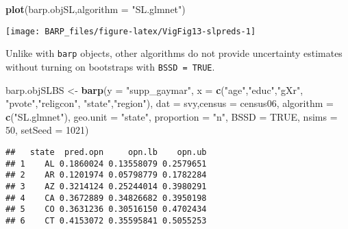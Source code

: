 \documentclass[]{article}
\newenvironment{Shaded}{\begin{snugshade}}{\end{snugshade}}
\newcommand{\KeywordTok}[1]{\textcolor[rgb]{0.13,0.29,0.53}{\textbf{#1}}}
\newcommand{\DataTypeTok}[1]{\textcolor[rgb]{0.13,0.29,0.53}{#1}}
\newcommand{\DecValTok}[1]{\textcolor[rgb]{0.00,0.00,0.81}{#1}}
\newcommand{\StringTok}[1]{\textcolor[rgb]{0.31,0.60,0.02}{#1}}
\newcommand{\OtherTok}[1]{\textcolor[rgb]{0.56,0.35,0.01}{#1}}
\newcommand{\OperatorTok}[1]{\textcolor[rgb]{0.81,0.36,0.00}{\textbf{#1}}}
\newcommand{\NormalTok}[1]{#1}
\begin{document}
\begin{Shaded}
\begin{Highlighting}[]
\KeywordTok{plot}\NormalTok{(barp.objSL,}\DataTypeTok{algorithm =} \StringTok{"SL.glmnet"}\NormalTok{)}
\end{Highlighting}
\end{Shaded}

\begin{center}\texttt{[image: BARP\_files/figure-latex/VigFig13-slpreds-1]} \end{center}

Unlike with \texttt{barp} objects, other algorithms do not provide
uncertainty estimates without turning on bootstraps with
\texttt{BSSD\ =\ TRUE}.

\begin{Shaded}
\begin{Highlighting}[]
\NormalTok{barp.objSLBS <-}\StringTok{ }\KeywordTok{barp}\NormalTok{(}\DataTypeTok{y =} \StringTok{"supp_gaymar"}\NormalTok{,}
                 \DataTypeTok{x =} \KeywordTok{c}\NormalTok{(}\StringTok{"age"}\NormalTok{,}\StringTok{"educ"}\NormalTok{,}\StringTok{"gXr"}\NormalTok{,}
                       \StringTok{"pvote"}\NormalTok{,}\StringTok{"religcon"}\NormalTok{,}
                       \StringTok{"state"}\NormalTok{,}\StringTok{"region"}\NormalTok{),}
                 \DataTypeTok{dat =}\NormalTok{ svy,}\DataTypeTok{census =}\NormalTok{ census06,}
                 \DataTypeTok{algorithm =} \KeywordTok{c}\NormalTok{(}\StringTok{"SL.glmnet"}\NormalTok{),}
                 \DataTypeTok{geo.unit =} \StringTok{"state"}\NormalTok{,}
                 \DataTypeTok{proportion =} \StringTok{"n"}\NormalTok{,}
                 \DataTypeTok{BSSD =} \OtherTok{TRUE}\NormalTok{,}
                 \DataTypeTok{nsims =} \DecValTok{50}\NormalTok{,}
                 \DataTypeTok{setSeed =} \DecValTok{1021}\NormalTok{)}
\end{Highlighting}
\end{Shaded}

\begin{Shaded}
\end{Shaded}

\begin{verbatim}
##   state  pred.opn     opn.lb    opn.ub
## 1    AL 0.1860024 0.13558079 0.2579651
## 2    AR 0.1201974 0.05798779 0.1782284
## 3    AZ 0.3214124 0.25244014 0.3980291
## 4    CA 0.3672889 0.34826682 0.3950198
## 5    CO 0.3631236 0.30516150 0.4702434
## 6    CT 0.4153072 0.35595841 0.5055253
\end{verbatim}
\end{document}
